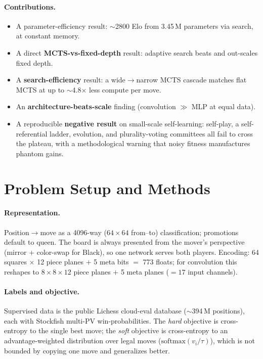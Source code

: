 \documentclass[11pt]{article}
\begin{document}
\paragraph{Contributions.}
\begin{itemize}\itemsep2pt
\item A parameter-efficiency result: $\sim$2800 Elo from 3.45\,M parameters via search, at constant memory.
\item A direct \textbf{MCTS-vs-fixed-depth} result: adaptive search beats and out-scales fixed depth.
\item A \textbf{search-efficiency} result: a wide$\rightarrow$narrow MCTS cascade matches flat MCTS at up to $\sim$4.8$\times$ less compute per move.
\item An \textbf{architecture-beats-scale} finding (convolution $\gg$ MLP at equal data).
\item A reproducible \textbf{negative result} on small-scale self-learning: self-play, a self-referential ladder, evolution, and plurality-voting committees all fail to cross the plateau, with a methodological warning that noisy fitness manufactures phantom gains.
\end{itemize}

\section{Problem Setup and Methods}
\paragraph{Representation.} Position$\rightarrow$move as a 4096-way ($64\times64$ from--to)
classification; promotions default to queen. The board is always presented from the mover's
perspective (mirror $+$ color-swap for Black), so one network serves both players. Encoding:
64 squares $\times$ 12 piece planes $+$ 5 meta bits $=$ 773 floats; for convolution this reshapes to
$8\times8\times12$ piece planes $+$ 5 meta planes ($=17$ input channels).

\paragraph{Labels and objective.} Supervised data is the public Lichess cloud-eval database
($\sim$394\,M positions), each with Stockfish multi-PV win-probabilities. The \emph{hard} objective
is cross-entropy to the single best move; the \emph{soft} objective is cross-entropy to an
advantage-weighted distribution over legal moves ($\mathrm{softmax}(v_i/\tau)$), which is not
bounded by copying one move and generalizes better.
\end{document}
